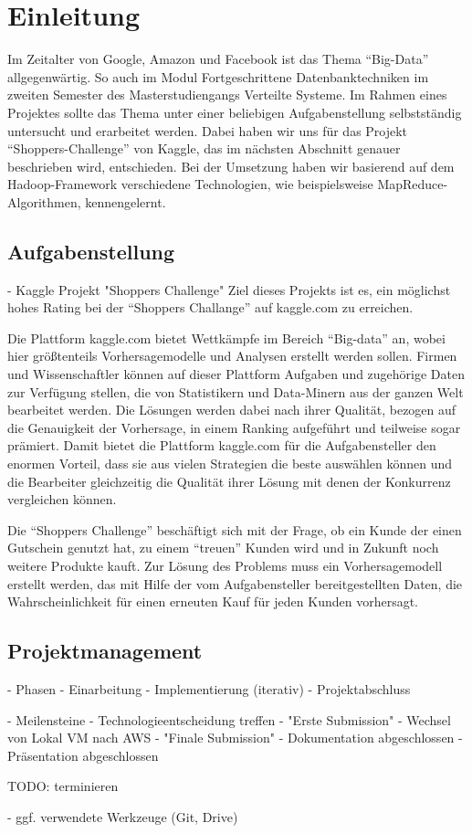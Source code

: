 \section{Einleitung}
Im Zeitalter von Google, Amazon und Facebook ist das Thema "`Big-Data"' allgegenwärtig. So auch im Modul Fortgeschrittene Datenbanktechniken im zweiten Semester des Masterstudiengangs Verteilte Systeme. Im Rahmen eines Projektes sollte das Thema unter einer beliebigen Aufgabenstellung selbstständig untersucht und erarbeitet werden. Dabei haben wir uns für das Projekt "`Shoppers-Challenge"' von Kaggle, das im nächsten Abschnitt genauer beschrieben wird, entschieden. Bei der Umsetzung haben wir basierend auf dem Hadoop-Framework verschiedene Technologien, wie beispielsweise MapReduce-Algorithmen, kennengelernt.

\subsection{Aufgabenstellung}
- Kaggle Projekt "Shoppers Challenge"
Ziel dieses Projekts ist es, ein möglichst hohes Rating bei der "`Shoppers Challange"' auf kaggle.com zu erreichen.

Die Plattform kaggle.com bietet Wettkämpfe im Bereich "`Big-data"' an, wobei hier größtenteils Vorhersagemodelle und Analysen erstellt werden sollen. Firmen und Wissenschaftler können auf dieser Plattform Aufgaben und zugehörige Daten zur Verfügung stellen, die von Statistikern und Data-Minern aus der ganzen Welt bearbeitet werden. Die Lösungen werden dabei nach ihrer Qualität, bezogen auf die Genauigkeit der Vorhersage, in einem Ranking aufgeführt und teilweise sogar prämiert. Damit bietet die Plattform kaggle.com für die Aufgabensteller den enormen Vorteil, dass sie aus vielen Strategien die beste auswählen können und die Bearbeiter gleichzeitig die Qualität ihrer Lösung mit denen der Konkurrenz vergleichen können.

Die "`Shoppers Challenge"' beschäftigt sich mit der Frage, ob ein Kunde der einen Gutschein genutzt hat, zu einem "`treuen"' Kunden wird und in Zukunft noch weitere Produkte kauft. Zur Lösung des Problems muss ein Vorhersagemodell erstellt werden, das mit Hilfe der vom Aufgabensteller bereitgestellten Daten, die Wahrscheinlichkeit für einen erneuten Kauf für jeden Kunden vorhersagt. 

\subsection{Projektmanagement}
- Phasen
	- Einarbeitung
	- Implementierung (iterativ)
	- Projektabschluss
	
- Meilensteine
	- Technologieentscheidung treffen
	- "Erste Submission"
	- Wechsel von Lokal VM nach AWS
	- "Finale Submission" 
	- Dokumentation abgeschlossen
	- Präsentation abgeschlossen
	
	TODO: terminieren
	
- ggf. verwendete Werkzeuge (Git, Drive)





